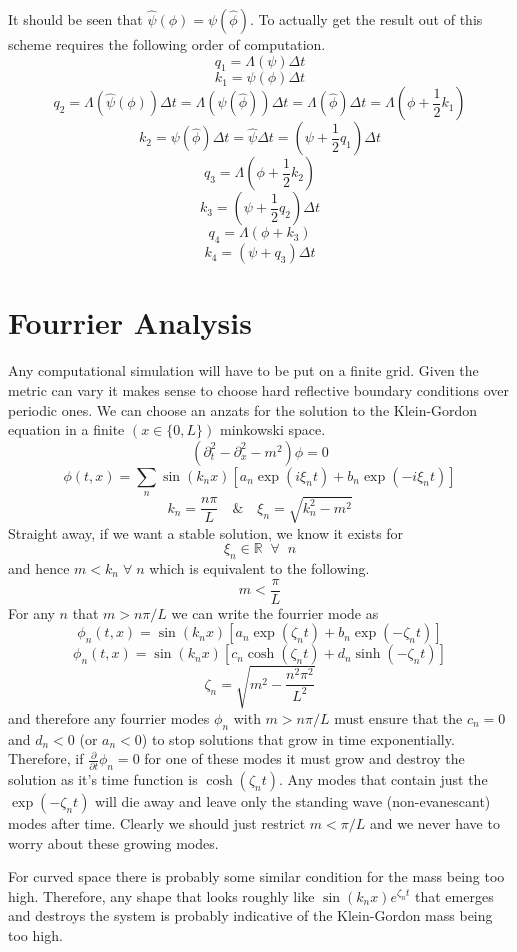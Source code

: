 \documentclass[11pt, oneside]{report}  %
\numberwithin{equation}{section}
\begin{document}
It should be seen that $\hat\psi(\phi) = \psi(\hat\phi)$. To actually get the result out of this scheme requires the following order of computation.
$$ q_1 =  \Lambda(\psi) \Delta t$$
$$ k_1 =  \psi(\phi)\Delta t$$
$$ q_2  = \Lambda(\hat\psi(\phi))\Delta t = \Lambda(\psi(\hat\phi))\Delta t  = \Lambda(\hat\phi)\Delta t = \Lambda(\phi + \frac{1}{2}k_1)$$
$$ k_2  = \psi(\hat\phi)\Delta t = \hat\psi\Delta t = (\psi + \frac{1}{2}q_1)\Delta t$$
$$ q_3  = \Lambda(\phi + \frac{1}{2}k_2)$$
$$ k_3  = (\psi + \frac{1}{2}q_2)\Delta t$$
$$ q_4  =  \Lambda(\phi + k_3)$$
$$ k_4  =  (\psi + q_3)\Delta t$$

\section{Fourrier Analysis}
Any computational simulation will have to be put on a finite grid. Given the metric can vary it makes sense to choose hard reflective boundary conditions over periodic ones. We can choose an anzats for the solution to the Klein-Gordon equation in a finite $(x \in \{0,L \})$ minkowski space.
$$ (\partial_t^2 - \partial_x^2 - m^2)\phi = 0 $$
$$ \phi(t,x) = \sum_n \sin(k_n x) \left[ a_n\exp(i\xi_n t) + b_n \exp(-i\xi_n t) \right]$$ 
$$ k_n = \frac{n\pi}{L} \quad \& \quad \xi_n = \sqrt{k_n^2 - m^2}$$
Straight away, if we want a stable solution, we know it exists for $$ \xi_n \in \mathbb{R} \;\; \forall \;\; n$$ and hence $m<k_n \;\forall\;n$ which is equivalent to the following.
$$ \boxed{m < \frac{\pi}{L}} $$
For any $n$ that $m>n\pi/L$ we can write the fourrier mode as 
$$ \phi_n(t,x) =\sin(k_n x) \left[ a_n\exp(\zeta_n t) + b_n \exp(-\zeta_n t) \right] $$
$$ \phi_n(t,x) =\sin(k_n x) \left[ c_n\cosh(\zeta_n t) +d_n \sinh(-\zeta_n t) \right] $$
$$ \zeta_n = \sqrt{m^2-\frac{n^2\pi^2}{L^2}}$$
and therefore any fourrier modes $\phi_n$ with $m>n\pi/L$ must ensure that the $c_n =0$ and $d_n < 0$ (or $a_n <0$) to stop solutions that grow in time exponentially. Therefore, if $\frac{\partial}{\partial t}{\phi_n} =0$ for one of these modes it must grow and destroy the solution as it's time function is $\cosh(\zeta_n t)$. Any modes that contain just the $\exp(-\zeta_n t)$ will die away and leave only the standing wave (non-evanescant) modes after time. Clearly we should just restrict $m<\pi/L$ and we never have to worry about these growing modes. 

For curved space there is probably some similar condition for the mass being too high. Therefore, any shape that looks roughly like $\sin(k_n x)e^{\zeta_n t} $ that emerges and destroys the system is probably indicative of the Klein-Gordon mass being too high.
\end{document}
